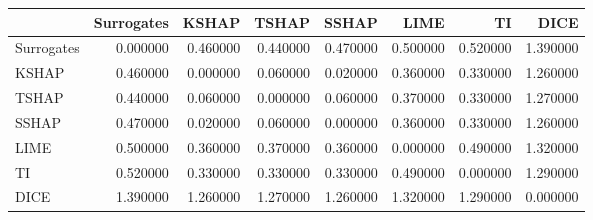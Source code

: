 \begin{tabular}{lrrrrrrr}
\toprule
 & Surrogates & KSHAP & TSHAP & SSHAP & LIME & TI & DICE \\
\midrule
Surrogates & 0.000000 & 0.460000 & 0.440000 & 0.470000 & 0.500000 & 0.520000 & 1.390000 \\
KSHAP & 0.460000 & 0.000000 & 0.060000 & 0.020000 & 0.360000 & 0.330000 & 1.260000 \\
TSHAP & 0.440000 & 0.060000 & 0.000000 & 0.060000 & 0.370000 & 0.330000 & 1.270000 \\
SSHAP & 0.470000 & 0.020000 & 0.060000 & 0.000000 & 0.360000 & 0.330000 & 1.260000 \\
LIME & 0.500000 & 0.360000 & 0.370000 & 0.360000 & 0.000000 & 0.490000 & 1.320000 \\
TI & 0.520000 & 0.330000 & 0.330000 & 0.330000 & 0.490000 & 0.000000 & 1.290000 \\
DICE & 1.390000 & 1.260000 & 1.270000 & 1.260000 & 1.320000 & 1.290000 & 0.000000 \\
\bottomrule
\end{tabular}
